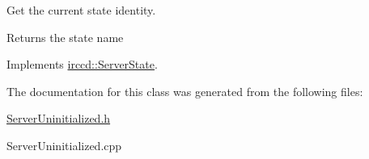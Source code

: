 Get the current state identity.

\begin{DoxyReturn}{Returns}
the state name 
\end{DoxyReturn}


Implements \hyperlink{a00060_af0912101bf33a1097470fae68b6d1c74}{irccd\-::\-Server\-State}.



The documentation for this class was generated from the following files\-:\begin{DoxyCompactItemize}
\item 
\hyperlink{a00137}{Server\-Uninitialized.\-h}\item 
Server\-Uninitialized.\-cpp\end{DoxyCompactItemize}
